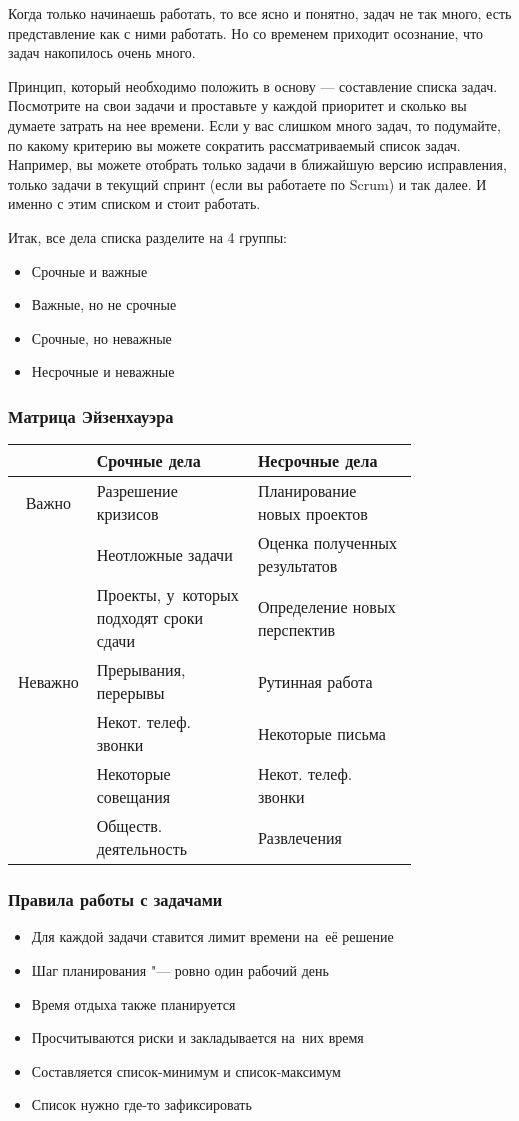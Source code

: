 \documentclass{../industrial-development}
\begin{document}
\lecturenotes

Когда только начинаешь работать, то все ясно и понятно, задач не так много, есть представление как с ними работать. Но со временем приходит осознание, что задач накопилось очень много.

Принцип, который необходимо положить в основу — составление списка задач. Посмотрите на свои задачи и проставьте у каждой приоритет и сколько вы думаете затрать на нее времени. Если у вас слишком много задач, то подумайте, по какому критерию вы можете сократить рассматриваемый список задач. Например, вы можете отобрать только задачи в ближайшую версию исправления, только задачи в текущий спринт (если вы работаете по Scrum) и так далее. И именно с этим списком и стоит работать.

Итак, все дела списка разделите на 4 группы:
\begin{itemize}
\item Срочные и важные
\item Важные, но не срочные
\item Срочные, но неважные
\item Несрочные и неважные~\cite{TMHabr}
\end{itemize}

\begin{frame} \frametitle{Матрица Эйзенхауэра}
  \begin{table}
    \begin{tabular}{|c|p{0.4\linewidth}|p{0.4\linewidth}|}
		\hline
		 & Срочные дела & Несрочные дела \\
		\hline
		Важно & Разрешение кризисов & Планирование новых проектов \\
		 & Неотложные задачи & Оценка полученных результатов \\
		 & Проекты, у~которых подходят сроки сдачи & Определение новых перспектив \\
		\hline
		Неважно & Прерывания, перерывы & Рутинная работа \\
		 & Некот. телеф. звонки & Некоторые письма \\
		 & Некоторые совещания & Некот. телеф. звонки \\
		 & Обществ. деятельность & Развлечения \\
		\hline
    \end{tabular}
  \end{table}
\end{frame}

\begin{frame} \frametitle{Правила работы с задачами}
  \begin{itemize}
  \item Для каждой задачи ставится лимит времени на~её решение
  \item Шаг планирования "--- ровно один рабочий день
  \item Время отдыха также планируется
  \item Просчитываются риски и закладывается на~них время
  \item Составляется список-минимум и список-максимум
  \item Список нужно где-то зафиксировать
  \end{itemize}
\end{frame}
\end{document}
